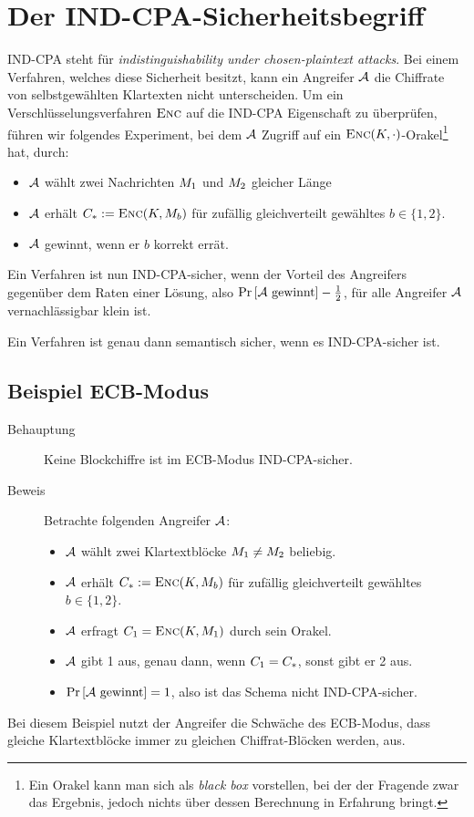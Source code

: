 \section{Der IND-CPA-Sicherheitsbegriff}\label{def:ind-cpa}
IND-CPA steht für \emph{indistinguishability under chosen-plaintext attacks}. Bei einem Verfahren, welches diese Sicherheit besitzt, kann ein Angreifer $\mathcal{A}$
die Chiffrate von selbstgewählten Klartexten nicht unterscheiden. Um ein Verschlüsselungsverfahren $\textsc{Enc}$ auf die IND-CPA Eigenschaft zu überprüfen, führen wir folgendes Experiment, bei dem $\mathcal{A}$ Zugriff auf ein $\textsc{Enc}(K,\cdot)$-Orakel\footnote{Ein Orakel kann man sich als \textit{black box} vorstellen, bei der der Fragende zwar das Ergebnis, jedoch nichts über dessen Berechnung in Erfahrung bringt.} hat, durch:
\begin{itemize}
\item $\mathcal{A}$ wählt zwei Nachrichten $M_1$ und $M_2$ gleicher Länge
\item $\mathcal{A}$ erhält $C_* := \textsc{Enc}(K, M_{b})$ für zufällig gleichverteilt gewähltes $b \in \{1, 2\}$.
\item $\mathcal{A}$ gewinnt, wenn er $b$ korrekt errät.
\end{itemize}
Ein Verfahren ist nun IND-CPA-sicher, wenn der Vorteil des Angreifers gegenüber dem Raten einer Lösung, also $\Pr \left[ \mathcal{A} \text{
gewinnt} \right] - \frac{1}{2}$, für alle Angreifer $\mathcal{A}$ vernachlässigbar klein ist. 
\begin{theorem}
Ein Verfahren ist genau dann semantisch sicher, wenn es IND-CPA-sicher ist.
\end{theorem}

\subsection{Beispiel ECB-Modus}
\begin{description} 
	\item[Behauptung] Keine Blockchiffre ist im ECB-Modus IND-CPA-sicher.
	\item[Beweis] Betrachte folgenden Angreifer $\mathcal{A}$:
	\begin{itemize}
		\item $\mathcal{A}$ wählt zwei Klartextblöcke $M_1 \neq M_2$ beliebig.
		\item $\mathcal{A}$ erhält  $C_* := \textsc{Enc}(K, M_{b})$ für zufällig gleichverteilt gewähltes $b \in \{1, 2\}$.
		\item $\mathcal{A}$ erfragt $C_1 = \textsc{Enc}(K, M_1)$ durch sein Orakel.
		\item $\mathcal{A}$ gibt 1 aus, genau dann, wenn $C_1 = C_*$, sonst gibt er 2 aus.
		\item $\Pr \left[ \mathcal{A} \text{ gewinnt} \right] = 1$, also ist das Schema nicht IND-CPA-sicher.
	\end{itemize}
\end{description}
Bei diesem Beispiel nutzt der Angreifer die Schwäche des ECB-Modus, dass gleiche Klartextblöcke immer zu gleichen Chiffrat-Blöcken werden, aus.

